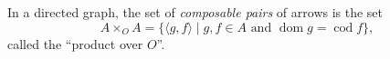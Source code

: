 In a directed graph, the set of \emph{composable pairs} of arrows is the set
$$A \times_O A = \{ \langle g, f \rangle \mid g, f \in A \text{ and } \operatorname{dom} g = \operatorname{cod} f \},$$
called the ``product over $O$''.
